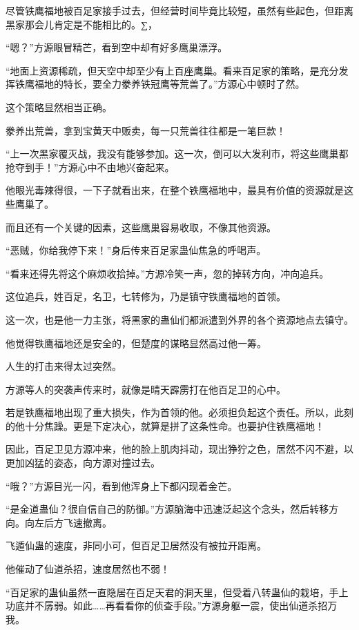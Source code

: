
\begin{this_body}

尽管铁鹰福地被百足家接手过去，但经营时间毕竟比较短，虽然有些起色，但距离黑家那会儿肯定是不能相比的。∑，

“嗯？”方源眼冒精芒，看到空中却有好多鹰巢漂浮。

“地面上资源稀疏，但天空中却至少有上百座鹰巢。看来百足家的策略，是充分发挥铁鹰福地的特长，要全力豢养铁冠鹰等荒兽了。”方源心中顿时了然。

这个策略显然相当正确。

豢养出荒兽，拿到宝黄天中贩卖，每一只荒兽往往都是一笔巨款！

“上一次黑家覆灭战，我没有能够参加。这一次，倒可以大发利市，将这些鹰巢都抢夺到手！”方源心中不由地兴奋起来。

他眼光毒辣得很，一下子就看出来，在整个铁鹰福地中，最具有价值的资源就是这些鹰巢了。

而且还有一个关键的因素，这些鹰巢容易收取，不像其他资源。

“恶贼，你给我停下来！”身后传来百足家蛊仙焦急的呼喝声。

“看来还得先将这个麻烦收拾掉。”方源冷笑一声，忽的掉转方向，冲向追兵。

这位追兵，姓百足，名卫，七转修为，乃是镇守铁鹰福地的首领。

这一次，也是他一力主张，将黑家的蛊仙们都派遣到外界的各个资源地点去镇守。

他觉得铁鹰福地还是安全的，但楚度的谋略显然高过他一筹。

人生的打击来得太过突然。

方源等人的突袭声传来时，就像是晴天霹雳打在他百足卫的心中。

若是铁鹰福地出现了重大损失，作为首领的他。必须担负起这个责任。所以，此刻的他十分焦躁。更是下定决心，就算是拼了这条性命。也要护住铁鹰福地！

因此，百足卫见方源冲来，他的脸上肌肉抖动，现出狰狞之色，居然不闪不避，以更加凶猛的姿态，向方源对撞过去。

“哦？”方源目光一闪，看到他浑身上下都闪现着金芒。

“是金道蛊仙？很自信自己的防御。”方源脑海中迅速泛起这个念头，然后转移方向。向左后方飞速撤离。

飞遁仙蛊的速度，非同小可，但百足卫居然没有被拉开距离。

他催动了仙道杀招，速度居然也不弱！

“百足家的蛊仙虽然一直隐居在百足天君的洞天里，但受着八转蛊仙的栽培，手上功底并不孱弱。如此……再看看你的侦查手段。”方源身躯一震，使出仙道杀招万我。


\end{this_body}
